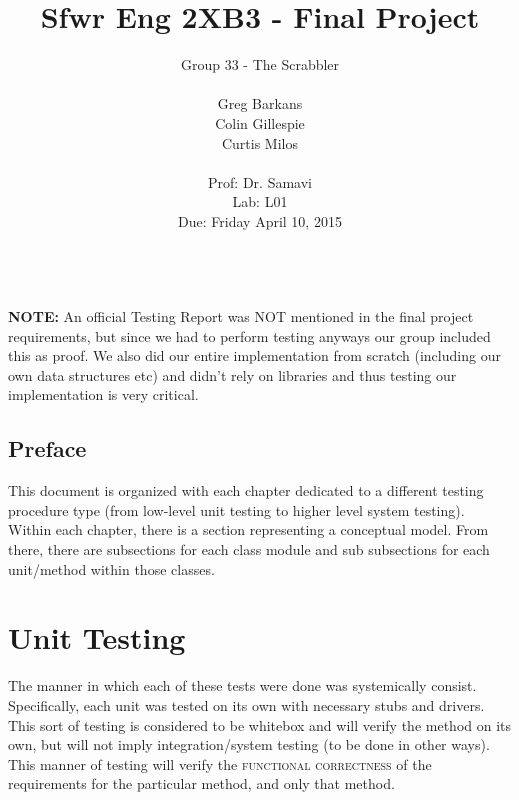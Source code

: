 \documentclass[11pt, oneside]{report}
\title{Sfwr Eng 2XB3 - Final Project}
\author{ 
	Group 33  - The Scrabbler \\ \\         
	Greg Barkans \\
	Colin Gillespie \\
	Curtis Milos \\
	 \vspace{1cm} \\
	Prof: Dr. Samavi \\
	Lab: L01 \\
	Due: Friday April 10, 2015 \\
	\vspace{1cm} \\
}
\date{}
\begin{document}
    
\maketitle                  

\textbf{NOTE:} An official Testing Report was NOT mentioned in the final project requirements, but since we had to perform testing anyways our group included this as proof.  We also did our entire implementation from scratch (including our own data structures etc) and didn't rely on libraries and thus testing our implementation is very critical. 
\newpage     
\tableofcontents   
\newpage             
\listoffigures         
\newpage
\listoftables
\newpage


\section*{Preface}
This document is organized with each chapter dedicated to a different testing procedure type (from low-level unit testing to higher level system testing).  Within each chapter,  there is a section representing a conceptual model.  From there, there are subsections for each class module and sub subsections for each unit/method within those classes.  



\chapter{Unit Testing}
The manner in which each of these tests were done was systemically consist.  Specifically, each unit was tested on its own with necessary stubs and drivers.  This sort of testing is considered to be whitebox and will verify the method on its own, but will not imply integration/system testing (to be done in other ways).  This manner of testing will verify the \textsc{functional correctness} of the requirements for the particular method, and only that method.
\end{document}
